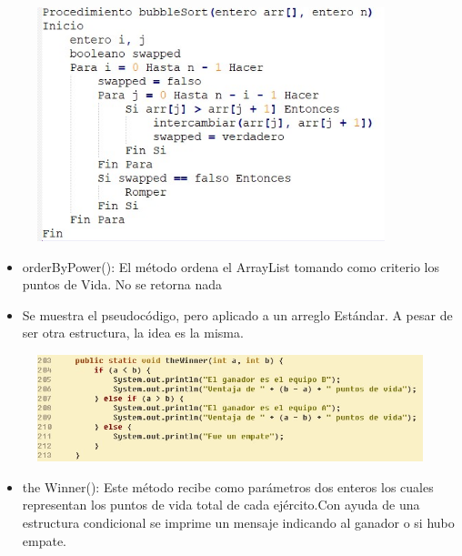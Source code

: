 \documentclass{article}
\begin{document}
	\begin{figure}[H]
		\centering
		\includegraphics[width=0.9\textwidth,keepaspectratio]{img/burbuja.jpg}
	\end{figure}
	
	
	\begin{itemize}	
		\item orderByPower(): El método ordena el ArrayList tomando como criterio los puntos de Vida. No se retorna nada
		\item Se muestra el pseudocódigo, pero aplicado a un arreglo Estándar. A pesar de ser otra estructura, la idea es la misma.
	\end{itemize}
		
		

	
	
	\begin{figure}[H]
		\centering
		\includegraphics[width=1.1\textwidth,keepaspectratio]{img/theWinner.jpg}
	\end{figure}
	
	\begin{itemize}	
		\item the Winner(): Este método recibe como parámetros dos enteros los cuales representan los puntos de vida total de cada ejército.Con ayuda de una estructura condicional se imprime un mensaje indicando al ganador o si hubo empate.
	\end{itemize}
	
\end{document}
